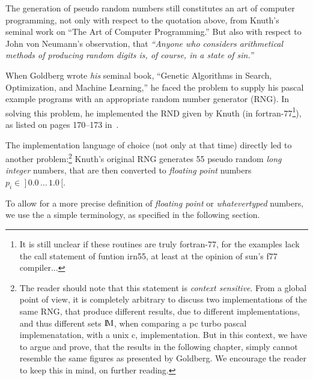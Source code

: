 \iffalse

The generation of pseudo random numbers still constitutes an art of computer
programming, not only with respect to the quotation above, from Knuth's
seminal work on ``The Art of Computer Programming.'' But also with respect
to John von Neumann's observation, that {\em ``Anyone who considers
arithmetical methods of producing random digits is, of course, in a state of
sin.''}

When Goldberg wrote {\em his} seminal book, ``Genetic Algorithms in Search,
Optimization, and Machine Learning,'' he faced the problem to
supply his {\sc pascal} example programs with an appropriate
random number generator (RNG).
In solving this problem, he implemented the RND given by Knuth (in
{\sc fortran-77}\footnote{%
It is still unclear if these routines are truly {\sc fortran-77},
for the examples lack the {\sc call} statement of funtion {\sc irn55},
at least at the opinion of {\sc sun's f77} compiler...
}), as listed on pages 170--173 in~\cite{Knuth:81}.

The implementation language of choice (not only at that time) directly
led to another problem:\footnote{%
The reader should note that this statement is {\em context sensitive}\/.
From a global point of view, it is completely arbitrary to discuss two
implementations of the same RNG, that produce different results, due
to different implementations, and thus different sets $\M$, when
comparing a {\sc pc turbo pascal} implemenatation, with
a {\sc unix c}, implementation. But in this context, we have to argue and
prove, that the results in the following chapter, simply cannot
resemble the same figures as presented by Goldberg. We encourage the
reader to keep this in mind, on further reading.}
Knuth's original RNG generates 55
pseudo random {\em long integer\/} numbers, that are then converted to
{\em floating point\/} numbers $p_i \in\ ]\, 0.0\,\ldots\,1.0\, [$.

To allow for a more precise definition of {\em floating point\/} or
{\em whatevertyped} numbers, we use the a simple terminology,
as specified in the following section.

